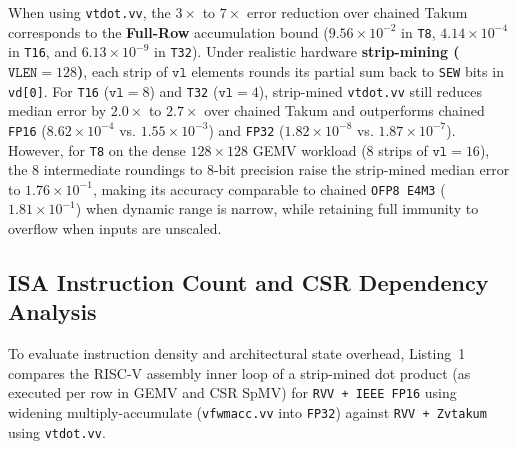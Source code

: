 \documentclass[conference]{IEEEtran}
\begin{document}
When using \texttt{vtdot.vv}, the $3\times$ to $7\times$ error reduction over chained Takum corresponds to the \textbf{Full-Row} accumulation bound ($9.56 \times 10^{-2}$ in \texttt{T8}, $4.14 \times 10^{-4}$ in \texttt{T16}, and $6.13 \times 10^{-9}$ in \texttt{T32}). Under realistic hardware \textbf{strip-mining ($\texttt{VLEN}=128$)}, each strip of $\texttt{vl}$ elements rounds its partial sum back to \texttt{SEW} bits in \texttt{vd[0]}. For \texttt{T16} ($\texttt{vl}=8$) and \texttt{T32} ($\texttt{vl}=4$), strip-mined \texttt{vtdot.vv} still reduces median error by $2.0\times$ to $2.7\times$ over chained Takum and outperforms chained \texttt{FP16} ($8.62 \times 10^{-4}$ vs. $1.55 \times 10^{-3}$) and \texttt{FP32} ($1.82 \times 10^{-8}$ vs. $1.87 \times 10^{-7}$). However, for \texttt{T8} on the dense $128 \times 128$ GEMV workload (8 strips of $\texttt{vl}=16$), the 8 intermediate roundings to 8-bit precision raise the strip-mined median error to $1.76 \times 10^{-1}$, making its accuracy comparable to chained \texttt{OFP8 E4M3} ($1.81 \times 10^{-1}$) when dynamic range is narrow, while retaining full immunity to overflow when inputs are unscaled.
\subsection{ISA Instruction Count and CSR Dependency Analysis}
\label{sec:isa_csr}

To evaluate instruction density and architectural state overhead, Listing~1 compares the RISC-V assembly inner loop of a strip-mined dot product (as executed per row in GEMV and CSR SpMV) for \texttt{RVV + IEEE FP16} using widening multiply-accumulate (\texttt{vfwmacc.vv} into \texttt{FP32}) against \texttt{RVV + Zvtakum} using \texttt{vtdot.vv}.
\end{document}
